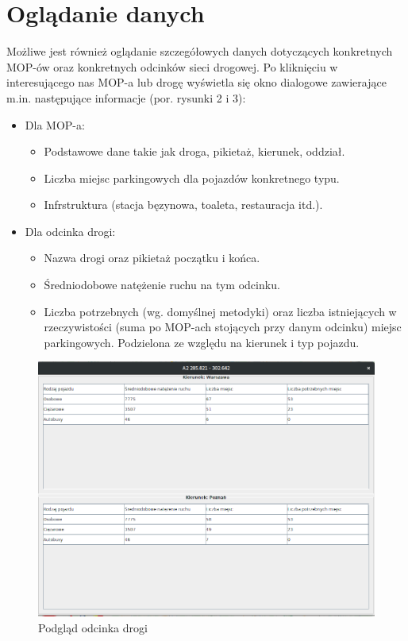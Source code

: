\documentclass[10pt,paper=a4 BCOR0, DIV15, titlepage=false, oneside]{scrbook} %
\begin{document}
        \section{Oglądanie danych}
      Możliwe jest również oglądanie szczegółowych danych dotyczących
      konkretnych MOP-ów oraz konkretnych odcinków sieci drogowej. Po
      kliknięciu w interesującego nas MOP-a lub drogę wyświetla się okno
      dialogowe zawierające m.in. następujące informacje (por. rysunki 2 i 3):
      \begin{itemize}
        \item Dla MOP-a:
          \begin{itemize}
            \item Podstawowe dane takie jak droga, pikietaż, kierunek, oddział.
            \item Liczba miejsc parkingowych dla pojazdów konkretnego typu.
            \item Infrstruktura (stacja bęzynowa, toaleta, restauracja itd.).
          \end{itemize}
        \item Dla odcinka drogi:
          \begin{itemize}
            \item Nazwa drogi oraz pikietaż początku i końca.
            \item Średniodobowe natężenie ruchu na tym odcinku.
            \item Liczba potrzebnych (wg. domyślnej metodyki) oraz liczba
              istniejących w rzeczywistości (suma po MOP-ach stojących przy
              danym odcinku) miejsc parkingowych. Podzielona ze względu na
              kierunek i typ pojazdu.
          \end{itemize}
      \end{itemize}
      \begin{figure}[ht]
        \centering
       \includegraphics[width=.8\textwidth]{podglad_drogi.png}
        \caption{Podgląd odcinka drogi}
      \end{figure}
\end{document}
